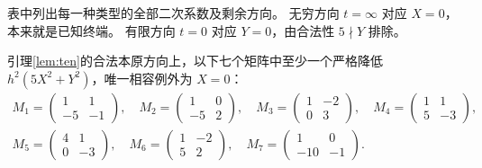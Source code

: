 表中列出每一种类型的全部二次系数及剩余方向。
无穷方向 $t=\infty$ 对应 $X=0$，本来就是已知终端。
有限方向 $t=0$ 对应 $Y=0$，由合法性 $5\nmid Y$ 排除。

\begin{proposition}[十元二次覆盖证书]\label{prop:ten-certificate}
引理\ref{lem:ten}的合法本原方向上，以下七个矩阵中至少一个严格降低 $h^2(5X^2+Y^2)$，唯一相容例外为 $X=0$：
\[
\begin{gathered}
M_1=\begin{pmatrix}1&1\\-5&-1\end{pmatrix},\quad
M_2=\begin{pmatrix}1&0\\-5&2\end{pmatrix},\quad
M_3=\begin{pmatrix}1&-2\\0&3\end{pmatrix},\quad
M_4=\begin{pmatrix}1&1\\5&-3\end{pmatrix},\\
M_5=\begin{pmatrix}4&1\\0&-3\end{pmatrix},\quad
M_6=\begin{pmatrix}1&-2\\5&2\end{pmatrix},\quad
M_7=\begin{pmatrix}1&0\\-10&-1\end{pmatrix}.
\end{gathered}
\]
\end{proposition}
